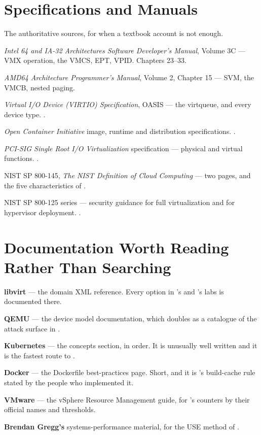 \section{Specifications and Manuals}

The authoritative sources, for when a textbook account is not enough.

\begin{tight}
  \item \emph{Intel 64 and IA-32 Architectures Software Developer's Manual},
        Volume 3C --- VMX operation, the VMCS, EPT, VPID. Chapters 23--33.
  \item \emph{AMD64 Architecture Programmer's Manual}, Volume 2, Chapter 15 ---
        SVM, the VMCB, nested paging.
  \item \emph{Virtual I/O Device (VIRTIO) Specification}, OASIS --- the
        virtqueue, and every device type. .
  \item \emph{Open Container Initiative} image, runtime and distribution
        specifications. .
  \item \emph{PCI-SIG Single Root I/O Virtualization} specification ---
        physical and virtual functions. .
  \item NIST SP 800-145, \emph{The NIST Definition of Cloud Computing} --- two
        pages, and the five characteristics of .
  \item NIST SP 800-125 series --- security guidance for full virtualization
        and for hypervisor deployment. .
\end{tight}

\section{Documentation Worth Reading Rather Than Searching}

\begin{tight}
  \item \textbf{libvirt} --- the domain XML reference. Every option in
        's and 's labs is documented there.
  \item \textbf{QEMU} --- the device model documentation, which doubles as a
        catalogue of the attack surface in .
  \item \textbf{Kubernetes} --- the concepts section, in order. It is unusually
        well written and it is the fastest route to .
  \item \textbf{Docker} --- the Dockerfile best-practices page. Short, and it is
        's build-cache rule stated by the people who implemented
        it.
  \item \textbf{VMware} --- the vSphere Resource Management guide, for
        's counters by their official names and thresholds.
  \item \textbf{Brendan Gregg's} systems-performance material, for the USE
        method of .
\end{tight}

